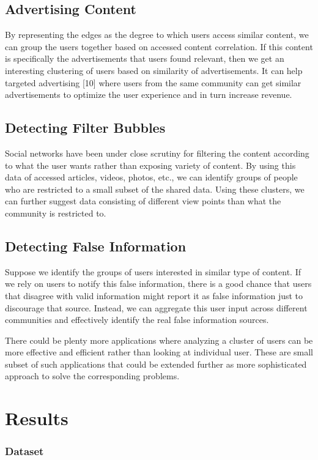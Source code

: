 \documentclass{article}
\begin{document}
\subsection{Advertising Content}
By representing the edges as the degree to which users access similar content, we can group the users together based on
accessed content correlation. If this content is specifically the advertisements that users found relevant, then we get
an interesting clustering of users based on similarity of advertisements. It can help targeted advertising [10] where
users from the same community can get similar advertisements to optimize the user experience and in turn increase
revenue.

\subsection{Detecting Filter Bubbles}
Social networks have been under close scrutiny for filtering the content according to what the user wants rather than
exposing variety of content. By using this data of accessed articles, videos, photos, etc., we can identify groups of
people who are restricted to a small subset of the shared data. Using these clusters, we can further suggest data
consisting of different view points than what the community is restricted to.

\subsection{Detecting False Information}
Suppose we identify the groups of users interested in similar type of content. If we rely on users to notify this false
information, there is a good chance that users that disagree with valid information might report it as false information
just to discourage that source. Instead, we can aggregate this user input across different communities and effectively
identify the real false information sources. 

There could be plenty more applications where analyzing a cluster of users can be more effective and efficient rather
than looking at individual user. These are small subset of such applications that could be extended further as more
sophisticated approach to solve the corresponding problems.  
\section{Results}
\subsubsection{Dataset}
\label{headings}
\end{document}
